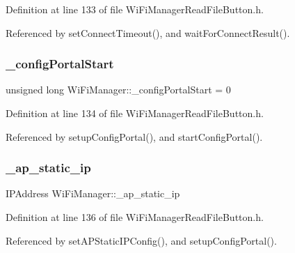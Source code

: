 Definition at line 133 of file Wi\+Fi\+Manager\+Read\+File\+Button.\+h.



Referenced by set\+Connect\+Timeout(), and wait\+For\+Connect\+Result().

\mbox{\label{class_wi_fi_manager_a64bd63776978c1f61ed9e84926cf4a51}} 
\subsubsection{\texorpdfstring{\+\_\+config\+Portal\+Start}{\_configPortalStart}}
{\footnotesize\ttfamily unsigned long Wi\+Fi\+Manager\+::\+\_\+config\+Portal\+Start = 0\hspace{0.3cm}{\ttfamily [private]}}



Definition at line 134 of file Wi\+Fi\+Manager\+Read\+File\+Button.\+h.



Referenced by setup\+Config\+Portal(), and start\+Config\+Portal().

\mbox{\label{class_wi_fi_manager_ae81b413e85811506099ba6eab48e1006}} 
\subsubsection{\texorpdfstring{\+\_\+ap\+\_\+static\+\_\+ip}{\_ap\_static\_ip}}
{\footnotesize\ttfamily I\+P\+Address Wi\+Fi\+Manager\+::\+\_\+ap\+\_\+static\+\_\+ip\hspace{0.3cm}{\ttfamily [private]}}



Definition at line 136 of file Wi\+Fi\+Manager\+Read\+File\+Button.\+h.



Referenced by set\+A\+P\+Static\+I\+P\+Config(), and setup\+Config\+Portal().

\mbox{\label{class_wi_fi_manager_a5ab87bab28f0dc3c865912b4bb303992}} 
